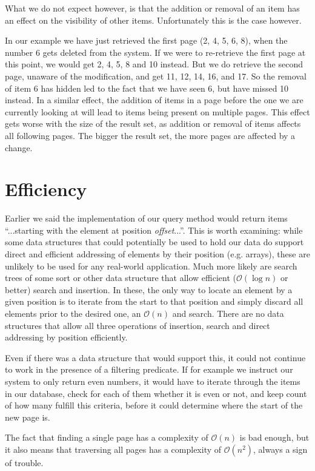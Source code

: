 \documentclass[11pt,a4paper]{article}
\begin{document}
\begin{multicols}{2}
What we do not expect however, is that the addition or removal of an item has an
effect on the visibility of other items. Unfortunately this is the case however. 

In our example we have just retrieved the first page (2, 4, 5, 6, 8), when the
number 6 gets deleted from the system. If we were to re-retrieve the first page
at this point, we would get 2, 4, 5, 8 and 10 instead. But we do retrieve the
second page, unaware of the modification, and get 11, 12, 14, 16, and 17. So the
removal of item 6 has hidden led to the fact that we have seen 6, but have
missed 10 instead. In a similar effect, the addition of items in a page before
the one we are currently looking at will lead to items being present on multiple
pages. This effect gets worse with the size of the result set, as addition or
removal of items affects all following pages. The bigger the result set, the
more pages are affected by a change.

\section*{Efficiency}
Earlier we said the implementation of our query method would return items 
``...starting with the element at position {\em offset}...''. This is worth
examining: while some data structures that could potentially be used to hold our
data do support direct and efficient addressing of elements by their position
(e.g. arrays), these are unlikely to be used for any real-world application.
Much more likely are search trees of some sort or other data structure that 
allow efficient ($\mathcal{O}(\log{}n)$ or better) search and insertion. In 
these, the only way to locate an element by a
given position is to iterate from the start to that position and simply discard
all elements prior to the desired one, an $\mathcal{O}(n)$ and search. There are
no data structures that allow all three operations of insertion, search and
direct addressing by position efficiently. 

Even if there was a data structure that would support this, it could not
continue to work in the presence of a filtering predicate. If for example we
instruct our system to only return even numbers, it would have to iterate
through the items in our database, check for each of them whether it is even or
not, and keep count of how many fulfill this criteria, before it could determine
where the start of the new page is.

The fact that finding a single page has a complexity of $\mathcal{O}(n)$ is bad
enough, but it also means that traversing all pages has a complexity of
$\mathcal{O}(n^2)$, always a sign of trouble.


\end{multicols}
\end{document}
